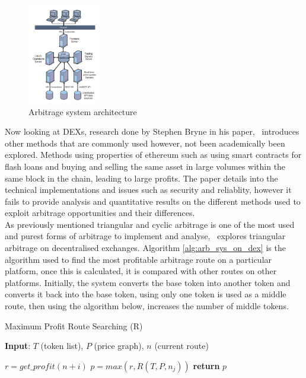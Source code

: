 \begin{figure}[!htb]
    \centering
    \includegraphics[width=0.28\textwidth]{background/Images/Arbitrage-Architecture.png}
    \caption{Arbitrage system architecture~\cite{PAUNACristian2018ATSf}}
\end{figure}

Now looking at DEXs, research done by Stephen Bryne in his paper,~\cite{byrneexploration} introduces other methods that are commonly used however, not been academically been explored. Methods using properties of ethereum such as using smart contracts for flash loans and buying and selling the same asset in large volumes within the same block in the chain, leading to large profits. The paper details into the technical implementations and issues such as security and reliablity, however it fails to provide analysis and quantitative results on the different methods used to exploit arbitrage opportunities and their differences.
\\[5mm]
As previously mentioned triangular and cyclic arbitrage is one of the most used and purest forms of arbitrage to implement and analyse,~\cite{boonpeam2021arbitrage} explores triangular arbitrage on decentralised exchanges. Algorithm \ref{alg:arb_sys_on_dex} is the algorithm used to find the most profitable arbitrage route on a particular platform, once this is calculated, it is compared with other routes on other platforms. Initially, the system converts the base token into another token and converts it back into the base token, using only one token is used as a middle route, then using the algorithm below, increases the number of middle tokens.

\begin{algorithm}
    \caption{Maximum Profit Route Searching (R)}\label{alg:arb_sys_on_dex}
    \textbf{Input}: $T$ (token list), $P$ (price graph), $n$ (current route)
    \begin{algorithmic}
        \State $r = get\_profit(n+i)$
            \State $p = max(r, R(T, P, n_j))$
        \EndFor
    \EndFor
    \State \textbf{return} $p$
    \end{algorithmic}
\end{algorithm}

